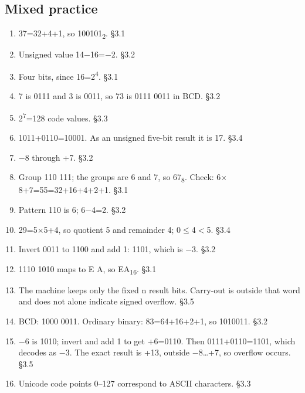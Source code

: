 \documentclass[11pt]{article}
\begin{document}
\begin{keepsection}\subsection{Mixed practice}

\begin{enumerate}
\item 37=32+4+1, so 100101\textsubscript{2}. \hfill{\small\color{FAUblue}§3.1}
\item Unsigned value 14\ensuremath{-}16=\ensuremath{-}2. \hfill{\small\color{FAUblue}§3.2}
\item Four bits, since 16=2\textsuperscript{4}. \hfill{\small\color{FAUblue}§3.1}
\item 7 is 0111 and 3 is 0011, so 73 is 0111 0011 in BCD. \hfill{\small\color{FAUblue}§3.2}
\item 2\textsuperscript{7}=128 code values. \hfill{\small\color{FAUblue}§3.3}
\item 1011+0110=10001. As an unsigned five-bit result it is 17. \hfill{\small\color{FAUblue}§3.4}
\item \ensuremath{-}8 through +7. \hfill{\small\color{FAUblue}§3.2}
\item Group 110 111; the groups are 6 and 7, so 67\textsubscript{8}. Check: 6\ensuremath{\times}8+7=55=32+16+4+2+1. \hfill{\small\color{FAUblue}§3.1}
\item Pattern 110 is 6; 6\ensuremath{-}4=2. \hfill{\small\color{FAUblue}§3.2}
\item 29=5\ensuremath{\times}5+4, so quotient 5 and remainder 4; 0\ensuremath{\leq}4\ensuremath{<}5. \hfill{\small\color{FAUblue}§3.4}
\item Invert 0011 to 1100 and add 1: 1101, which is \ensuremath{-}3. \hfill{\small\color{FAUblue}§3.2}
\item 1110 1010 maps to E A, so EA\textsubscript{16}. \hfill{\small\color{FAUblue}§3.1}
\item The machine keeps only the fixed n result bits. Carry-out is outside that word and does not alone indicate signed overflow. \hfill{\small\color{FAUblue}§3.5}
\item BCD: 1000 0011. Ordinary binary: 83=64+16+2+1, so 1010011. \hfill{\small\color{FAUblue}§3.2}
\item \ensuremath{-}6 is 1010; invert and add 1 to get +6=0110. Then 0111+0110=1101, which decodes as \ensuremath{-}3. The exact result is +13, outside \ensuremath{-}8…+7, so overflow occurs. \hfill{\small\color{FAUblue}§3.5}
\item Unicode code points 0–127 correspond to ASCII characters. \hfill{\small\color{FAUblue}§3.3}

\end{enumerate}
\end{keepsection}
\end{document}
